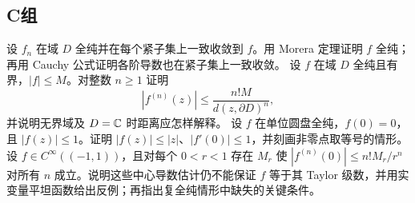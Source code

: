 \subsection*{C组}
\begin{enumerate}[label=\textbf{\thechapter.\arabic*.},resume]
设 \(f_n\) 在域 \(D\) 全纯并在每个紧子集上一致收敛到 \(f\)。用 Morera 定理证明 \(f\) 全纯；再用 Cauchy 公式证明各阶导数也在紧子集上一致收敛。
设 \(f\) 在域 \(D\) 全纯且有界，\(|f|\le M\)。对整数 \(n\ge1\) 证明
\[
 |f^{(n)}(z)|\le\frac{n!M}{d(z,\partial D)^n},
\]
并说明无界域及 \(D=\mathbb{C}\) 时距离应怎样解释。
设 \(f\) 在单位圆盘全纯，\(f(0)=0\)，且 \(|f(z)|\le1\)。证明 \(|f(z)|\le|z|\)、\(|f'(0)|\le1\)，并刻画非零点取等号的情形。
设 \(f\in C^\infty((-1,1))\)，且对每个 \(0<r<1\) 存在 \(M_r\) 使
\(|f^{(n)}(0)|\le n!M_r/r^n\) 对所有 \(n\) 成立。说明这些中心导数估计仍不能保证 \(f\) 等于其 Taylor 级数，并用实变量平坦函数给出反例；再指出复全纯情形中缺失的关键条件。
\end{enumerate}

